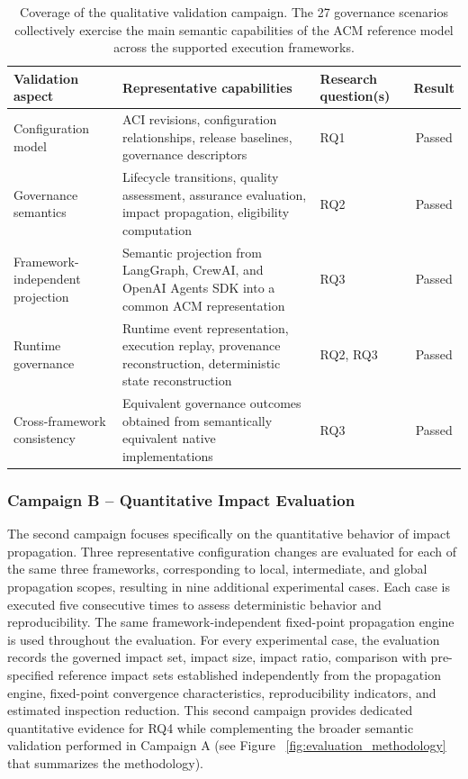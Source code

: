 \documentclass[10pt]{article}
\begin{document}
\begin{table}[t]
	\caption{Coverage of the qualitative validation campaign. The 27 governance scenarios collectively exercise the main semantic capabilities of the ACM reference model across the supported execution frameworks.}
	\label{tab:qualitative_validation}
	\centering
	\footnotesize
	\begin{tabular}{p{3.2cm}p{4.5cm}p{1.8cm}c}
		\toprule
		\textbf{Validation aspect} &
		\textbf{Representative capabilities} &
		\textbf{Research question(s)} &
		\textbf{Result} \\
		\midrule
		
		Configuration model
		&
		ACI revisions, configuration relationships, release baselines, governance descriptors
		&
		RQ1
		&
		Passed
		\\
		
		Governance semantics
		&
		Lifecycle transitions, quality assessment, assurance evaluation, impact propagation, eligibility computation
		&
		RQ2
		&
		Passed
		\\
		
		Framework-independent projection
		&
		Semantic projection from LangGraph, CrewAI, and OpenAI Agents SDK into a common ACM representation
		&
		RQ3
		&
		Passed
		\\
		
		Runtime governance
		&
		Runtime event representation, execution replay, provenance reconstruction, deterministic state reconstruction
		&
		RQ2, RQ3
		&
		Passed
		\\
		
		Cross-framework consistency
		&
		Equivalent governance outcomes obtained from semantically equivalent native implementations
		&
		RQ3
		&
		Passed
		\\
		
		\bottomrule
	\end{tabular}
\end{table}

\subsubsection{Campaign B -- Quantitative Impact Evaluation} The second campaign focuses specifically on the quantitative behavior of impact propagation. Three representative configuration changes are evaluated for each of the same three frameworks, corresponding to local, intermediate, and global propagation scopes, resulting in nine additional experimental cases. Each case is executed five consecutive times to assess deterministic behavior and reproducibility. The same framework-independent fixed-point propagation engine is used throughout the evaluation. For every experimental case, the evaluation records the governed impact set, impact size, impact ratio, comparison with pre-specified reference impact sets established independently from the propagation engine, fixed-point convergence characteristics, reproducibility indicators, and estimated inspection reduction. This second campaign provides dedicated quantitative evidence for RQ4 while complementing the broader semantic validation performed in Campaign A  (see Figure ~\ref{fig:evaluation_methodology} that summarizes the methodology). 
\end{document}
